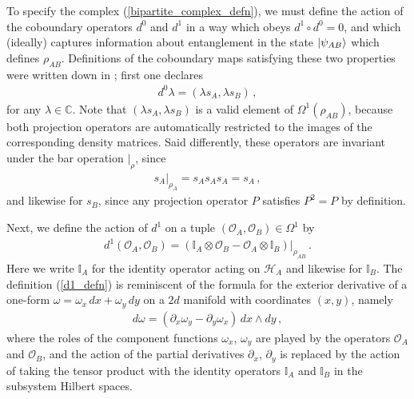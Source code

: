 \documentclass[12pt]{article}
\numberwithin{equation}{section}
\begin{document}
To specify the complex (\ref{bipartite_complex_defn}), we must define the action of the coboundary operators $d^0$ and $d^1$ in a way which obeys $d^1 \circ d^0 = 0$, and which (ideally) captures information about entanglement in the state $\ket{\psi_{AB}}$ which defines $\rho_{AB}$. Definitions of the coboundary maps satisfying these two properties were written down in \cite{Mainiero:2019enr}; first one declares
%
\begin{align}\label{d0_bipartite}
    d^0 \lambda = ( \lambda s_A, \lambda s_B ) \, ,
\end{align}
%
for any $\lambda \in \mathbb{C}$. Note that $( \lambda s_A, \lambda s_B )$ is a valid element of $\Omega^1 ( \rho_{AB} )$, because both projection operators are automatically restricted to the images of the corresponding density matrices. Said differently, these operators are invariant under the bar operation $\big\vert_{\rho}$, since
%
\begin{align}
    s_A \big\vert_{\rho_A} = s_A s_A s_A = s_A \, ,
\end{align}
%
and likewise for $s_B$, since any projection operator $P$ satisfies $P^2 = P$ by definition.

Next, we define the action of $d^1$ on a tuple $(\mathcal{O}_A, \mathcal{O}_B) \in \Omega^1$ by
%
\begin{align}\label{d1_defn}
    d^1 ( \mathcal{O}_A , \mathcal{O}_B ) = \left( \mathbb{I}_A \otimes \mathcal{O}_B - \mathcal{O}_A \otimes \mathbb{I}_B \right) \big\vert_{\rho_{AB}} \, .
\end{align}
%
Here we write $\mathbb{I}_A$ for the identity operator acting on $\mathcal{H}_A$ and likewise for $\mathbb{I}_B$. The definition (\ref{d1_defn}) is reminiscent of the formula for the exterior derivative of a one-form $\omega = \omega_x \, dx + \omega_y \, dy$ on a $2d$ manifold with coordinates $(x, y)$, namely
%
\begin{align}
    d \omega = \left( \partial_x \omega_y - \partial_y \omega_x \right) \, dx \wedge dy \, ,
\end{align}
%
where the roles of the component functions $\omega_x$, $\omega_y$ are played by the operators $\mathcal{O}_A$ and $\mathcal{O}_B$, and the action of the partial derivatives $\partial_x$, $\partial_y$ is replaced by the action of taking the tensor product with the identity operators $\mathbb{I}_A$ and $\mathbb{I}_B$ in the subsystem Hilbert spaces.
\end{document}
